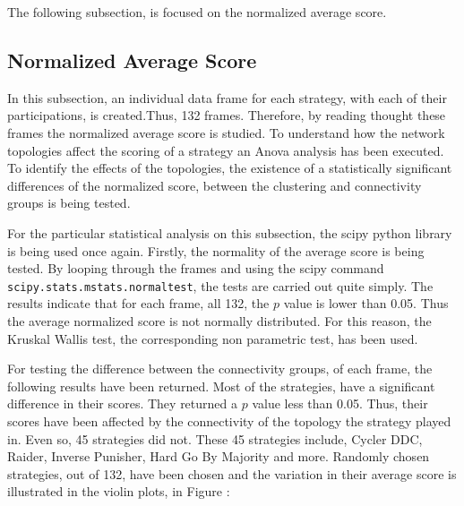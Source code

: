 The following subsection, is focused on the normalized average score.

\subsection{Normalized Average Score}

In this subsection, an individual data frame for each strategy, with each of
their participations, is created.Thus, 132 frames. Therefore, by reading thought
these frames
the normalized average score is studied. To understand how the network topologies
affect the scoring of a strategy an Anova analysis has been executed.
To identify the effects of the topologies, the existence of a
statistically significant differences of the normalized score, between the
clustering and connectivity groups is being tested.

For the particular statistical analysis on this subsection, the scipy
python library is being used once again. Firstly, the normality of the average
score is being tested. By looping through the frames and using the scipy
command \texttt{scipy.stats.mstats.normaltest}, the tests are carried out quite simply.
The results indicate that for
each frame, all 132, the \(p\) value is lower than 0.05. Thus the average normalized
score is not normally distributed. For this reason, the Kruskal Wallis test, the
corresponding non parametric test, has been used.

For testing the difference between the connectivity groups, of each frame,
the following results have been returned. Most of the strategies, have a significant
difference in their scores. They returned a \(p\) value less than 0.05.
Thus, their scores have been affected by the connectivity  of the topology the
strategy played in. Even so, 45 strategies did not. These 45 strategies include,
Cycler DDC, Raider, Inverse Punisher, Hard Go By Majority and more. Randomly
chosen strategies, out of 132, have been chosen and the variation in their average
score is illustrated in the violin plots, in Figure :

